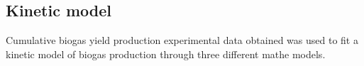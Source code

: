 \subsection{Kinetic model}
Cumulative biogas yield production experimental data obtained was used to fit a kinetic model of biogas production through three different mathe models.